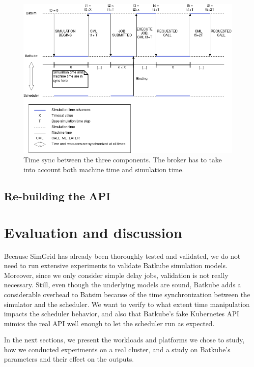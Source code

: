\documentclass[12pt, a4paper]{memoir}
\begin{document}
\begin{figure}[H]
	\centering
	\includegraphics[width=\textwidth]{imgs/lignes_de_temps.png}
	\caption{Time sync between the three components. The broker has to take
	into account both machine time and simulation time.}
	\label{fig:time_sync}
\end{figure}


\section{Re-building the API}

\chapter{Evaluation and discussion}

Because SimGrid has already been thoroughly tested and validated, we do not
need to run extensive experiments to validate Batkube simulation models.
Moreover, since we only consider simple delay jobs, validation is not really
necessary. Still, even though the underlying models are sound, Batkube adds a
considerable overhead to Batsim because of the time synchronization between the
simulator and the scheduler. We want to verify to what extent time manipulation
impacts the scheduler behavior, and also that Batkube's fake Kubernetes API
mimics the real API well enough to let the scheduler run as expected.

In the next sections, we present the workloads and platforms we chose to study,
how we conducted experiments on a real cluster, and a study on Batkube's
parameters and their effect on the outputs.
\end{document}
